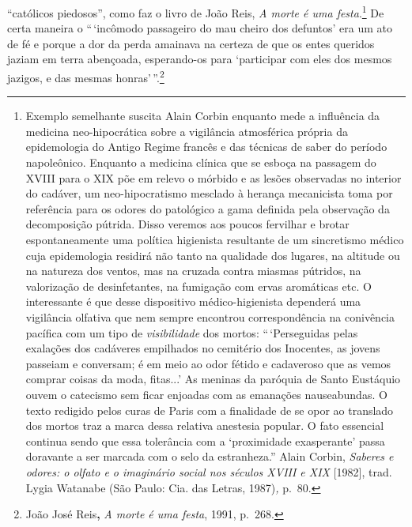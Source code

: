 ``católicos piedosos'', como faz o livro de João Reis, \emph{A morte é
uma festa}.\footnote{Exemplo semelhante suscita Alain Corbin enquanto
  mede a influência da medicina neo-hipocrática sobre a vigilância
  atmosférica própria da epidemologia do Antigo Regime francês e das
  técnicas de saber do período napoleônico. Enquanto a medicina clínica
  que se esboça na passagem do XVIII para o XIX põe em relevo o mórbido
  e as lesões observadas no interior do cadáver, um neo-hipocratismo
  mesclado à herança mecanicista toma por referência para os odores do
  patológico a gama definida pela observação da decomposição pútrida.
  Disso veremos aos poucos fervilhar e brotar espontaneamente uma
  política higienista resultante de um sincretismo médico cuja
  epidemologia residirá não tanto na qualidade dos lugares, na altitude
  ou na natureza dos ventos, mas na cruzada contra miasmas pútridos, na
  valorização de desinfetantes, na fumigação com ervas aromáticas etc. O
  interessante é que desse dispositivo médico-higienista dependerá uma
  vigilância olfativa que nem sempre encontrou correspondência na
  conivência pacífica com um tipo de \emph{visibilidade} dos mortos:
  ``\,`Perseguidas pelas exalações dos cadáveres empilhados no cemitério
  dos Inocentes, as jovens passeiam e conversam; é em meio ao odor
  fétido e cadaveroso que as vemos comprar coisas da moda, fitas...' As
  meninas da paróquia de Santo Eustáquio ouvem o catecismo sem ficar
  enjoadas com as emanações nauseabundas. O texto redigido pelos curas
  de Paris com a finalidade de se opor ao translado dos mortos traz a
  marca dessa relativa anestesia popular. O fato essencial continua
  sendo que essa tolerância com a `proximidade exasperante' passa
  doravante a ser marcada com o selo da estranheza.'' Alain Corbin,
  \emph{Saberes e odores: o olfato e o imaginário social nos séculos
  XVIII e XIX} {[}1982{]}, trad. Lygia Watanabe (São Paulo: Cia. das
  Letras, 1987)\emph{,} p.~80.} De certa maneira o ``\,`incômodo
passageiro do mau cheiro dos defuntos' era um ato de fé e porque a dor
da perda amainava na certeza de que os entes queridos jaziam em terra
abençoada, esperando-os para `participar com eles dos mesmos jazigos, e
das mesmas honras'\,''.\footnote{João José Reis\textbf{,} \emph{A morte
  é uma festa}, 1991, p.~268.}

